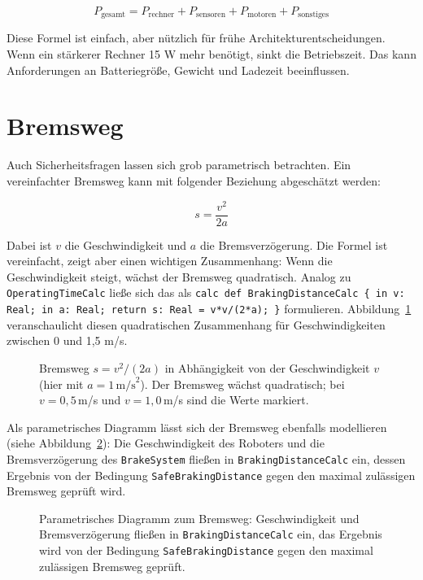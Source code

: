 \[
P_{\text{gesamt}} = P_{\text{rechner}} + P_{\text{sensoren}} + P_{\text{motoren}} + P_{\text{sonstiges}}
\]

Diese Formel ist einfach, aber nützlich für frühe Architekturentscheidungen. Wenn ein stärkerer Rechner 15 W mehr benötigt, sinkt die Betriebszeit. Das kann Anforderungen an Batteriegröße, Gewicht und Ladezeit beeinflussen.

\section{Bremsweg}
Auch Sicherheitsfragen lassen sich grob parametrisch betrachten. Ein vereinfachter Bremsweg kann mit folgender Beziehung abgeschätzt werden:

\[
s = \frac{v^2}{2a}
\]

Dabei ist \(v\) die Geschwindigkeit und \(a\) die Bremsverzögerung. Die Formel ist vereinfacht, zeigt aber einen wichtigen Zusammenhang: Wenn die Geschwindigkeit steigt, wächst der Bremsweg quadratisch. Analog zu \texttt{OperatingTimeCalc} ließe sich das als \texttt{calc def BrakingDistanceCalc \{ in v: Real; in a: Real; return s: Real = v*v/(2*a); \}} formulieren. Abbildung~\ref{fig:kap13-graph-bremsweg} veranschaulicht diesen quadratischen Zusammenhang für Geschwindigkeiten zwischen 0 und 1,5 m/s.

\begin{figure}[H]
  \centering
  \caption{Bremsweg $s = v^2/(2a)$ in Abhängigkeit von der Geschwindigkeit $v$ (hier mit $a=1\,\text{m/s}^2$). Der Bremsweg wächst quadratisch; bei $v=0{,}5$\,m/s und $v=1{,}0$\,m/s sind die Werte markiert.}
  \label{fig:kap13-graph-bremsweg}
\end{figure}

Als parametrisches Diagramm lässt sich der Bremsweg ebenfalls modellieren (siehe Abbildung~\ref{fig:kap13-parametrisch-bremsweg}): Die Geschwindigkeit des Roboters und die Bremsverzögerung des \texttt{BrakeSystem} fließen in \texttt{BrakingDistanceCalc} ein, dessen Ergebnis von der Bedingung \texttt{SafeBrakingDistance} gegen den maximal zulässigen Bremsweg geprüft wird.

\begin{figure}[H]
  \centering
  \caption{Parametrisches Diagramm zum Bremsweg: Geschwindigkeit und Bremsverzögerung fließen in \texttt{BrakingDistanceCalc} ein, das Ergebnis wird von der Bedingung \texttt{SafeBrakingDistance} gegen den maximal zulässigen Bremsweg geprüft.}
  \label{fig:kap13-parametrisch-bremsweg}
\end{figure}

